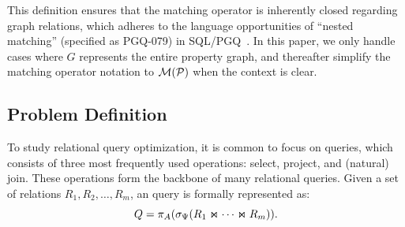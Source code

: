 This definition ensures that the matching operator is inherently closed regarding graph relations,
which adheres to the language opportunities of ``nested matching'' (specified as PGQ-079) in SQL/PGQ~\cite{sql-pgq}.
In this paper, we only handle cases where $G$ represents the entire property graph, and thereafter simplify the matching operator notation to $\mathcal{M}(\mathcal{P})$ when the context is clear.



\subsection{Problem Definition}
\label{sec:problem-definition}

To study relational query optimization, it is common to focus on \spj queries,
which consists of three most frequently used operations: select, project, and (natural) join.
These operations form the backbone of many relational queries. Given a set of relations \(R_1, R_2, \ldots, R_m\),
an \spj query is formally represented as:
\[
Q = \pi_A(\sigma_\Psi(R_1 \Join \cdots \Join R_m)).
\]

